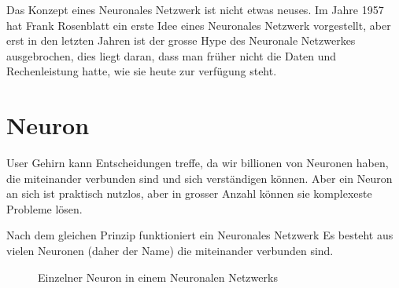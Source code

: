\documentclass[12pt,a4paper]{report}
\begin{document}
Das Konzept eines Neuronales Netzwerk ist nicht etwas neuses.
Im Jahre 1957 hat Frank Rosenblatt ein erste Idee eines Neuronales Netzwerk vorgestellt, aber erst in den letzten
Jahren ist der grosse Hype des Neuronale Netzwerkes ausgebrochen, dies liegt daran, dass man früher nicht die Daten
und Rechenleistung hatte, wie sie heute zur verfügung steht.

\section{Neuron}\label{sec:neuron}
User Gehirn kann Entscheidungen treffe, da wir billionen von Neuronen haben, die miteinander verbunden sind und sich
verständigen können.
Aber ein Neuron an sich ist praktisch nutzlos, aber in grosser Anzahl können sie komplexeste Probleme lösen.

Nach dem gleichen Prinzip funktioniert ein Neuronales Netzwerk
Es besteht aus vielen Neuronen (daher der Name) die miteinander verbunden sind.


\begin{figure}[!h]
    \centering
{}
    \caption{Einzelner Neuron in einem Neuronalen Netzwerks}
    \label{fig:neuron1}
\end{figure}
\end{document}
